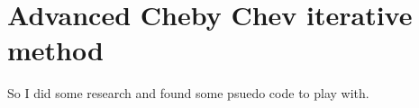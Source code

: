 \documentclass[]{article}
\newenvironment{Shaded}{\begin{snugshade}}{\end{snugshade}}
\newcommand{\KeywordTok}[1]{\textcolor[rgb]{0.13,0.29,0.53}{\textbf{#1}}}
\newcommand{\StringTok}[1]{\textcolor[rgb]{0.31,0.60,0.02}{#1}}
\newcommand{\ControlFlowTok}[1]{\textcolor[rgb]{0.13,0.29,0.53}{\textbf{#1}}}
\newcommand{\OperatorTok}[1]{\textcolor[rgb]{0.81,0.36,0.00}{\textbf{#1}}}
\newcommand{\NormalTok}[1]{#1}
\begin{document}
\section{Advanced Cheby Chev iterative
method}\label{advanced-cheby-chev-iterative-method}

So I did some research and found some psuedo code to play with.

\begin{Shaded}
\end{Shaded}
\end{document}
